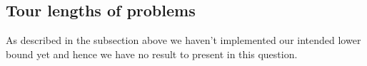 \subsection{Tour lengths of problems}

As described in the subsection above we haven't implemented our intended
lower bound yet and hence we have no result to present in this
question.
